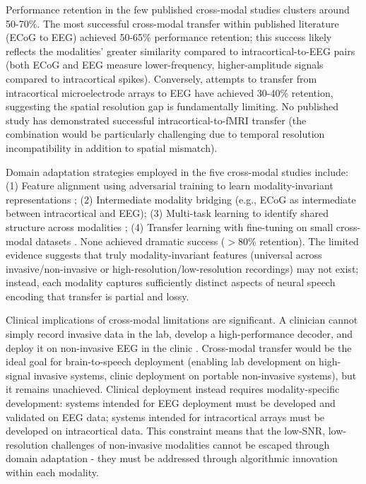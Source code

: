 Performance retention in the few published cross-modal studies clusters around 50-70\%. The most successful cross-modal transfer within published literature (ECoG to EEG) achieved 50-65\% performance retention; this success likely reflects the modalities' greater similarity compared to intracortical-to-EEG pairs (both ECoG and EEG measure lower-frequency, higher-amplitude signals compared to intracortical spikes). Conversely, attempts to transfer from intracortical microelectrode arrays to EEG have achieved 30-40\% retention, suggesting the spatial resolution gap is fundamentally limiting. No published study has demonstrated successful intracortical-to-fMRI transfer (the combination would be particularly challenging due to temporal resolution incompatibility in addition to spatial mismatch).

Domain adaptation strategies employed in the five cross-modal studies include: (1) Feature alignment using adversarial training to learn modality-invariant representations \cite{Peterson2021,Ma2023,Zhang2026Align}; (2) Intermediate modality bridging (e.g., ECoG as intermediate between intracortical and EEG); (3) Multi-task learning to identify shared structure across modalities \cite{Yang2026Corteg}; (4) Transfer learning with fine-tuning on small cross-modal datasets \cite{deBorman2024,Liu2026CrossBrain}. None achieved dramatic success ($>$80\% retention). The limited evidence suggests that truly modality-invariant features (universal across invasive/non-invasive or high-resolution/low-resolution recordings) may not exist; instead, each modality captures sufficiently distinct aspects of neural speech encoding that transfer is partial and lossy.

Clinical implications of cross-modal limitations are significant. A clinician cannot simply record invasive data in the lab, develop a high-performance decoder, and deploy it on non-invasive EEG in the clinic \cite{Yang2026Corteg,Liu2026CrossBrain}. Cross-modal transfer would be the ideal goal for brain-to-speech deployment (enabling lab development on high-signal invasive systems, clinic deployment on portable non-invasive systems), but it remains unachieved. Clinical deployment instead requires modality-specific development: systems intended for EEG deployment must be developed and validated on EEG data; systems intended for intracortical arrays must be developed on intracortical data. This constraint means that the low-SNR, low-resolution challenges of non-invasive modalities cannot be escaped through domain adaptation - they must be addressed through algorithmic innovation within each modality.

